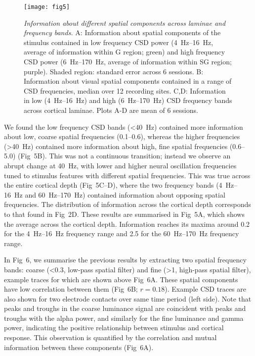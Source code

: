 \begin{figure}[htbp]
\centering \texttt{[image: fig5]}
%
\caption{%
\textit{Information about different spatial components across laminae and frequency bands.}
A: Information about spatial components of the stimulus contained in 
low frequency \ac{CSD} power (\SIrange{4}{16}{Hz}, average of information within \ac{G} region; green) and high 
frequency \ac{CSD} power (\SIrange{6}{170}{Hz}, average of information within \ac{SG} region; purple).
Shaded region: standard error across 6 sessions.
B: Information about visual spatial components contained in a range of \ac{CSD} frequencies, median over 12 recording sites.
C,D: Information in low (\SIrange{4}{16}{Hz}) and high (\SIrange{6}{170}{Hz}) 
\ac{CSD} frequency bands across cortical laminae.
Plots A-D are mean of 6 sessions.}%
\label{fig:lam_5}
%
\end{figure}

We found the low frequency \ac{CSD} bands (\SI{<40}{Hz}) contained more information about low, coarse spatial frequencies (\SIrange{0.1}{0.6}{\cpd}), whereas the higher frequencies (\SI{>40}{Hz}) contained more information about high, fine spatial frequencies (\SIrange{0.6}{5.0}{\cpd}) (Fig~5B).
This was not a continuous transition; instead we observe an abrupt change at \SI{40}{Hz}, with lower and higher neural oscillation frequencies tuned to stimulus features with different spatial frequencies.
This was true across the entire cortical depth (Fig~5C--D), where the two frequency bands (\SIrange{4}{16}{Hz} and \SIrange{60}{170}{Hz}) contained information about opposing spatial frequencies.
The distribution of information across the cortical depth corresponds to that found in Fig~2D.
These results are summarised in Fig~5A, which shows the average across the cortical depth.
Information reaches its maxima around \SI{0.2}{\cpd} for the \SIrange{4}{16}{Hz} frequency range and \SI{2.5}{\cpd} for the \SIrange{60}{170}{Hz} frequency range.

In Fig~6, we summarise the previous results by extracting two spatial frequency bands: coarse (\SI{<0.3}{\cpd}, low-pass spatial filter) and fine (\SI{>1}{\cpd}, high-pass spatial filter), example traces for which are shown above Fig~6A.
These spatial components have low correlation between them (Fig~6B; $r=0.18$).
Example \ac{CSD} traces are also shown for two electrode contacts over same time period (left side).
Note that peaks and troughs in the coarse luminance signal are coincident with peaks and troughs with the alpha power, and similarly for the fine luminance and gamma power, indicating the positive relationship between stimulus and cortical response.
This observation is quantified by the correlation and mutual information between these components (Fig~6A).

